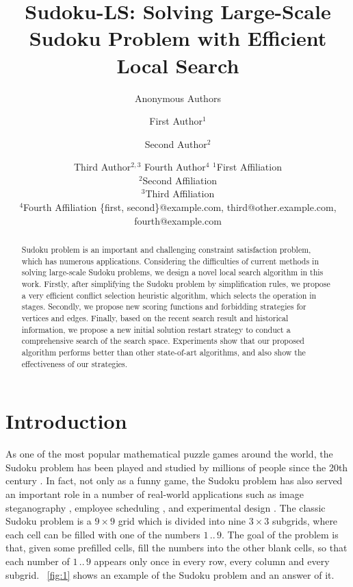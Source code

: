 \documentclass{article}
\title{Sudoku-LS: Solving Large-Scale Sudoku Problem with Efficient Local Search}
\author{
    Anonymous Authors
}
\author{
First Author$^1$
\and
Second Author$^2$\and
Third Author$^{2,3}$\And
Fourth Author$^4$
\affiliations
$^1$First Affiliation\\
$^2$Second Affiliation\\
$^3$Third Affiliation\\
$^4$Fourth Affiliation
\emails
\{first, second\}@example.com,
third@other.example.com,
fourth@example.com
}
\begin{document}
\maketitle

\begin{abstract}
    Sudoku problem is an important and challenging constraint satisfaction problem, which has numerous applications. Considering the difficulties of current methods in solving large-scale Sudoku problems, we design a novel local search algorithm in this work. Firstly, after simplifying the Sudoku problem by simplification rules, we propose a very efficient conflict selection heuristic algorithm, which selects the operation in stages. Secondly, we propose new scoring functions and forbidding strategies for vertices and edges. Finally, based on the recent search result and historical information, we propose a new initial solution restart strategy to conduct a comprehensive search of the search space. Experiments show that our proposed algorithm performs better than other state-of-art algorithms, and also show the effectiveness of our strategies.
\end{abstract}

\section{Introduction}

As one of the most popular mathematical puzzle games around the world, the Sudoku problem has been played and studied by millions of people since the 20th century \cite{delahaye2006science}.
In fact, not only as a funny game, the Sudoku problem has also served an important role in a number of real-world applications such as image steganography \cite{hsiao2021steganography}, employee scheduling \cite{musliu2017sudoku}, and experimental design \cite{sarkar2015sudoku}. 
The classic Sudoku problem is a $9 \times 9$ grid which is divided into nine $3 \times 3$ subgrids, where each cell can be filled with one of the numbers $1\,..\,9$. The goal of the problem is that, given some prefilled cells, fill the numbers into the other blank cells, so that each number of $1\,..\,9$ appears only once in every row, every column and every subgrid. \figurename~\ref{fig:1} shows an example of the Sudoku problem and an answer of it.

\end{document}
